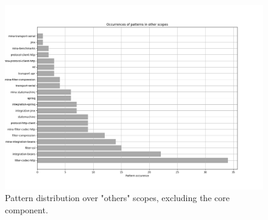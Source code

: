 \begin{figure}[H]
    \centering
    \includegraphics[width = \textwidth]{images/graphs/other_scopes.png}
    \caption{Pattern distribution over "others" scopes, excluding the core component.}
    \label{fig:others_scope_percentages}
\end{figure}

